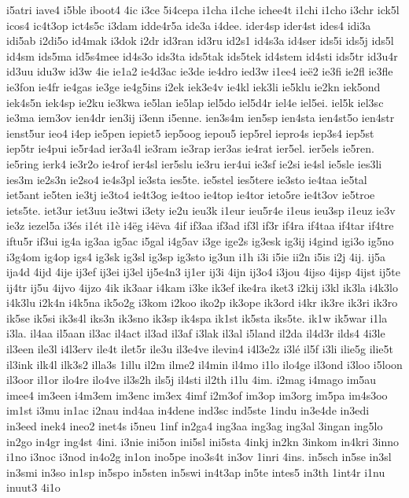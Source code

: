 {i5atri
iave4
i5ble
iboot4
4ic
i3ce
5i4cepa
i1cha
i1che
ichee4t
i1chi
i1cho
i3chr
ick5l
icos4
ic4t3op
ict4s5c
i3dam
idde4r5a
ide3a
i4dee.
ider4sp
ider4st
ides4
idi3a
idi5ab
i2di5o
id4mak
i3dok
i2dr
id3ran
id3ru
id2s1
id4s3a
id4ser
ids5i
ids5j
ids5l
id4sm
ids5ma
id5s4mee
id4s3o
ids3ta
ids5tak
ids5tek
id4stem
id4sti
ids5tr
id3u4r
id3uu
idu3w
id3w
4ie
ie1a2
ie4d3ac
ie3de
ie4dro
ied3w
i1ee4
ieë2
ie3fi
ie2fl
ie3fle
ie3fon
ie4fr
ie4gas
ie3ge
ie4g5ins
i2ek
iek3e4v
ie4kl
iek3li
ie5klu
ie2kn
iek5ond
iek4s5n
iek4sp
ie2ku
ie3kwa
ie5lan
ie5lap
iel5do
iel5d4r
iel4e
iel5ei.
iel5k
iel3sc
ie3ma
iem3ov
ien4dr
ien3ij
i3enn
i5enne.
ien3s4m
ien5sp
ien4sta
ien4st5o
ien4str
ienst5ur
ieo4
i4ep
ie5pen
iepiet5
iep5oog
iepou5
iep5rel
iepro4s
iep3s4
iep5st
iep5tr
ie4pui
ie5r4ad
ier3a4l
ie3ram
ie3rap
ier3as
ie4rat
ier5el.
ier5els
ie5ren.
ie5ring
ierk4
ie3r2o
ie4rof
ier4sl
ier5slu
ie3ru
ier4ui
ie3sf
ie2si
ie4sl
ie5sle
ies3li
ies3m
ie2s3n
ie2so4
ie4s3pl
ie3sta
ies5te.
ie5stel
ies5tere
ie3sto
ie4taa
ie5tal
iet5ant
ie5ten
ie3tj
ie3to4
ie4t3og
ie4too
ie4top
ie4tor
ieto5re
ie4t3ov
ie5troe
iets5te.
iet3ur
iet3uu
ie3twi
i3ety
ie2u
ieu3k
i1eur
ieu5r4e
i1eus
ieu3sp
i1euz
ie3v
ie3z
iezel5a
i3és
i1ét
i1è
i4ëg
i4ëva
4if
if3aa
if3ad
if3l
if3r
if4ra
if4taa
if4tar
if4tre
iftu5r
if3ui
ig4a
ig3aa
ig5ac
i5gal
i4g5av
i3ge
ige2s
ig3esk
ig3ij
i4gind
igi3o
ig5no
i3g4om
ig4op
igs4
ig3sk
ig3sl
ig3sp
ig3sto
ig3un
i1h
i3i
i5ie
ii2n
i5is
i2j
4ij.
ij5a
ija4d
4ijd
4ije
ij3ef
ij3ei
ij3el
ij5e4n3
ij1er
ij3i
4ijn
ij3o4
i3jou
4ijso
4ijsp
4ijst
ij5te
ij4tr
ij5u
4ijvo
4ijzo
4ik
ik3aar
i4kam
i3ke
ik3ef
ike4ra
iket3
i2kij
i3kl
ik3la
i4k3lo
i4k3lu
i2k4n
i4k5na
ik5o2g
i3kom
i2koo
iko2p
ik3ope
ik3ord
i4kr
ik3re
ik3ri
ik3ro
ik5se
ik5si
ik3s4l
iks3n
ik3sno
ik3sp
ik4spa
ik1st
ik5sta
iks5te.
ik1w
ik5war
i1la
i3la.
il4aa
il5aan
il3ac
il4act
il3ad
il3af
i3lak
il3al
i5land
il2da
il4d3r
ilds4
4i3le
il3een
ile3l
i4l3erv
ile4t
ilet5r
ile3u
il3e4ve
ilevin4
i4l3e2z
i3lé
il5f
i3li
ilie5g
ilie5t
il3ink
ilk4l
ilk3s2
illa3s
1illu
il2m
ilme2
il4min
il4mo
i1lo
ilo4ge
il3ond
i3loo
i5loon
il3oor
il1or
ilo4re
ilo4ve
il3s2h
ils5j
il4sti
il2th
i1lu
4im.
i2mag
i4mago
im5au
imee4
im3een
i4m3em
im3enc
im3ex
4imf
i2m3of
im3op
im3org
im5pa
im4s3oo
im1st
i3mu
in1ac
i2nau
ind4aa
in4dene
ind3sc
ind5ste
1indu
in3e4de
in3edi
in3eed
inek4
ineo2
inet4s
i5neu
1inf
in2ga4
ing3aa
ing3ag
ing3al
3ingan
ing5lo
in2go
in4gr
ing4st
4ini.
i3nie
ini5on
ini5sl
ini5sta
4inkj
in2kn
3inkom
in4kri
3inno
i1no
i3noc
i3nod
in4o2g
in1on
ino5pe
ino3s4t
in3ov
1inri
4ins.
in5sch
in5se
in3sl
in3smi
in3so
in1sp
in5spo
in5sten
in5swi
in4t3ap
in5te
intes5
in3th
1int4r
i1nu
inuut3
4i1o
}
